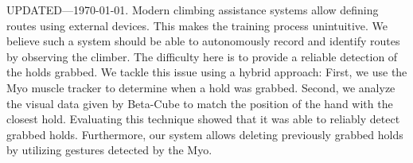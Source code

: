 UPDATED---\today.
Modern climbing assistance systems allow defining routes using external devices.
This makes the training process unintuitive.
We believe such a system should be able to autonomously record and identify routes by observing the climber.
The difficulty here is to provide a reliable detection of the holds grabbed.
We tackle this issue using a hybrid approach:
First, we use the Myo muscle tracker to determine when a hold was grabbed.
Second, we analyze the visual data given by Beta-Cube to match the position of the hand with the closest hold.
Evaluating this technique showed that it was able to reliably detect grabbed holds.
Furthermore, our system allows deleting previously grabbed holds by utilizing gestures detected by the Myo.